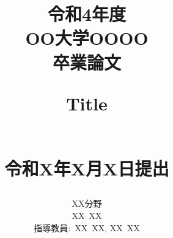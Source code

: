 \documentclass[12pt]{jreport}
\title{
{\Large 令和4年度\\[1mm]OO大学OOOO \\ 卒業論文} \\
\vspace{2cm}
\begin{minipage}[c]{16cm}
\begin{center}
{\LARGE Title}
\end{center}
\end{minipage}\\
\vspace{2cm}
{\Large 令和X年X月X日提出}
\vspace{2.5cm}
}
\author{
\Large XX分野 \vspace{5mm} \\
{\LARGE XX\ XX} \vspace{5mm} \\
指導教員:\ XX\ XX, XX\ XX
}
\date{}
\theoremstyle{break}
\begin{document}
\maketitle

\renewcommand{\thepage}{\roman{page}}


\newpage



\newpage
\tableofcontents


\newpage
\renewcommand{\thepage}{\arabic{page}}
\setcounter{page}{1}




\newpage



\newpage



\newpage



\newpage



\newpage



\newpage



%
\end{document}
